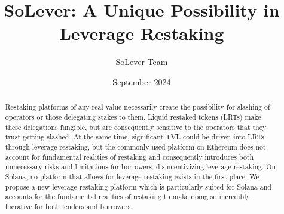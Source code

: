 \documentclass{article}
\title{SoLever: A Unique Possibility in Leverage Restaking}
\author{SoLever Team}
\date{September 2024}
\begin{document}
\maketitle


\begin{abstract}
    Restaking platforms of any real value necessarily create the possibility for slashing of operators or those delegating stakes to them. 
    Liquid restaked tokens (LRTs) make these delegations fungible, but are consequently sensitive to the operators that they trust getting slashed. 
    At the same time, significant TVL could be driven into LRTs through leverage restaking, but the commonly-used platform on Ethereum does not account for fundamental realities of restaking and consequently introduces both unnecessary risks and limitations for borrowers, disincentivizing leverage restaking. On Solana, no platform that allows for leverage restaking exists in the first place. We propose a new leverage restaking platform which is particularly suited for Solana and accounts for the fundamental realities of restaking to make doing so incredibly lucrative for both lenders and borrowers.
\end{abstract}
\end{document}
